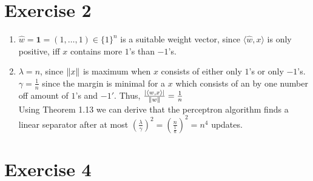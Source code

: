 \documentclass[12pt]{article}
\DeclarePairedDelimiter\abs{\lvert}{\rvert}
\DeclarePairedDelimiter\Abs{\lVert}{\rVert}
\begin{document}
\section*{Exercise 2}
\begin{enumerate}[label=(\alph*)]
	\item	$\hat{w}=\textbf{1}=(1, \dots, 1) \in \{1\}^n$ is a suitable weight vector, since $\langle \hat{w},x \rangle$ is only positive, iff $x$ contains more $1$'s than $-1$'s.
	\item	$\lambda = n$, since $\Abs{x}$ is maximum when $x$ consists of either only $1$'s or only $-1$'s. \\
			$\gamma = \frac{1}{n}$ since the margin is minimal for a $x$ which consists of an by one number off amount of $1$'s and $-1'$. Thus, $\frac{\abs{\langle w,x \rangle}}{\Abs{w}} = \frac{1}{n}$ \\
			Using Theorem 1.13 we can derive that the perceptron algorithm finds a linear separator after at most $\left(\frac{\lambda}{\gamma}\right)^2 = \left( \frac{n}{\frac{1}{n}}\right)^2 = n^4$ updates.
\end{enumerate}

\section*{Exercise 4}
\end{document}
